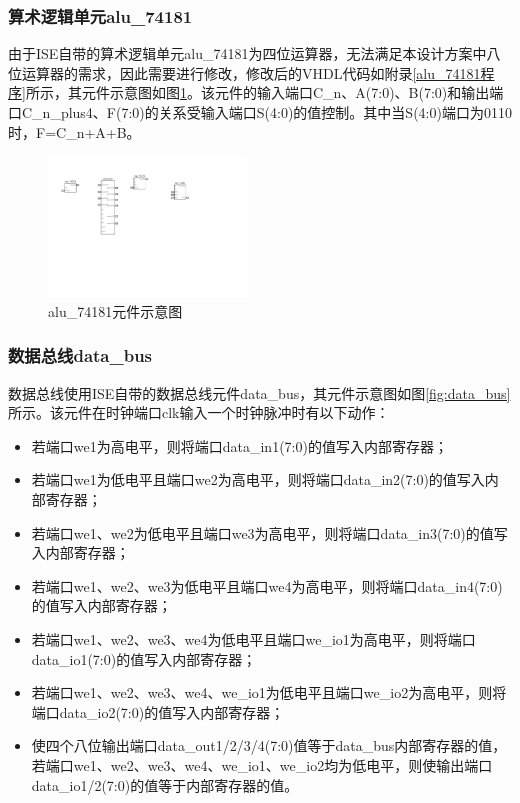 \documentclass[a4paper]{ctexart}
\begin{document}
\begin{spacing}{1.3}
	\subsubsection{算术逻辑单元alu\_74181}
	由于ISE自带的算术逻辑单元alu\_74181为四位运算器，无法满足本设计方案中八位运算器的需求，因此需要进行修改，修改后的VHDL代码如附录\ref{alu_74181程序}所示，其元件示意图如图\ref{fig:alu_74181}。该元件的输入端口C\_n、A(7:0)、B(7:0)和输出端口C\_n\_plus4、F(7:0)的关系受输入端口S(4:0)的值控制。其中当S(4:0)端口为0110时，F=C\_n+A+B。

	\begin{figure}[htbp]
		\centering
		\includegraphics[width=0.47\textwidth]{figure/alu_74181.pdf}
		\caption{alu\_74181元件示意图}\label{fig:alu_74181}
	\end{figure}

	\subsubsection{数据总线data\_bus}
	数据总线使用ISE自带的数据总线元件data\_bus，其元件示意图如图\ref{fig:data_bus}所示。该元件在时钟端口clk输入一个时钟脉冲时有以下动作：
	\begin{itemize}
		\item 若端口we1为高电平，则将端口data\_in1(7:0)的值写入内部寄存器；
		\item 若端口we1为低电平且端口we2为高电平，则将端口data\_in2(7:0)的值写入内部寄存器；
		\item 若端口we1、we2为低电平且端口we3为高电平，则将端口data\_in3(7:0)的值写入内部寄存器；
		\item 若端口we1、we2、we3为低电平且端口we4为高电平，则将端口data\_in4(7:0)的值写入内部寄存器；
		\item 若端口we1、we2、we3、we4为低电平且端口we\_io1为高电平，则将端口data\_io1(7:0)的值写入内部寄存器；
		\item 若端口we1、we2、we3、we4、we\_io1为低电平且端口we\_io2为高电平，则将端口data\_io2(7:0)的值写入内部寄存器；
		\item 使四个八位输出端口data\_out1/2/3/4(7:0)值等于data\_bus内部寄存器的值，若端口we1、we2、we3、we4、we\_io1、we\_io2均为低电平，则使输出端口data\_io1/2(7:0)的值等于内部寄存器的值。
	\end{itemize}


\end{spacing}
\end{document}
